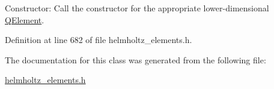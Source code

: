 Constructor\+: Call the constructor for the appropriate lower-\/dimensional \hyperlink{classoomph_1_1QElement}{Q\+Element}. 



Definition at line 682 of file helmholtz\+\_\+elements.\+h.



The documentation for this class was generated from the following file\+:\begin{DoxyCompactItemize}
\item 
\hyperlink{helmholtz__elements_8h}{helmholtz\+\_\+elements.\+h}\end{DoxyCompactItemize}
